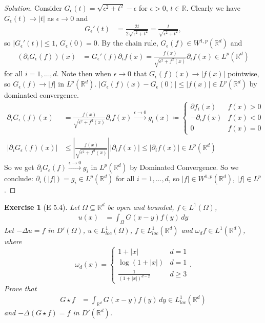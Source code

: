 \documentclass{report}
\theoremstyle{tommy}
\newtheorem{ex}[defn]{Exercise}
\begin{document}
  \begin{proof}[Solution]
    Consider \(G_\epsilon(t)= \sqrt{\epsilon^2 + t^2} - \epsilon\) for \(\epsilon > 0\), \(t \in \mathbb{R}\). Clearly we have \(G_\epsilon(t) \to |t|\) as \(\epsilon \to 0\) and 
    \begin{align*}
      G_\epsilon'(t) &= \frac{2t}{2 \sqrt{\epsilon^2 + t^2}} = \frac{t}{\sqrt{\epsilon^2 + t^2}},
    \end{align*}
    so \(|G_\epsilon'(t)| \le 1\), \(G_\epsilon(0) = 0\). By the chain rule, \(G_\epsilon(f) \in W^{1,p}(\mathbb{R}^d)\) and 
    \begin{align*}
      (\partial_i G_\epsilon(f))(x) &= G_\epsilon'(f) \partial_if(x) = \frac{f(x)}{\sqrt{\epsilon^2 + f^2(x)}} \partial_i f(x) \in L^p(\mathbb{R}^d)
    \end{align*}
    for all \(i = 1, \dots, d\). Note then when \(\epsilon \to 0\) that \(G_\epsilon(f)(x) \to |f(x)|\) pointwise, so \(G_\epsilon(f) \to |f|\) in \(L^p(\mathbb{R}^d)\). \(|G_\epsilon(f)(x) - G_\epsilon(0)| \le |f(x)| \in L^p(\mathbb{R}^d)\) by dominated convergence. \begin{align*}
      \partial_i G_\epsilon(f)(x) 
      &= \frac{f(x)}{\sqrt{\epsilon^2 + f^2(x)}} \partial_i f(x) \xrightarrow{\epsilon \to 0} g_i(x) \coloneqq \begin{cases}
        \partial f_i(x) & f(x) > 0 \\ - \partial_i f(x) & f(x) < 0 \\ 0 & f(x) = 0
      \end{cases} \\
      |\partial_i G_\epsilon(f)(x)|
      &\le \left| \frac{f(x)}{\sqrt{\epsilon^2 + f^2(x)}}\right| |\partial_i f(x)| \le |\partial_i f(x)| \in L^p(\mathbb{R}^d)
    \end{align*}
    So we get \(\partial_i G_\epsilon(f) \xrightarrow{\epsilon \to 0} g_i\) in \(L^p(\mathbb{R}^d)\) by Dominated Convergence. So we conclude: \(\partial_i(|f|) = g_i \in L^p(\mathbb{R}^d)\) for all \(i = 1, \dots, d\), so \(|f| \in W^{1,p}(\mathbb{R}^d)\), \(|f| \in L^p\).
  \end{proof}

  \begin{ex}[E 5.4]
    Let \(\Omega \subseteq \mathbb{R}^d\) be open and bounded, \(f \in L^1(\Omega)\), 
    \begin{align*}
      u(x) &= \int_\Omega G(x-y)f(y) \, dy
    \end{align*}
    Let \(- \Delta u = f\) in \(D'(\Omega)\), \(u \in L_{loc}^1(\Omega)\), \(f \in L_{loc}^1(\mathbb{R}^d)\) and \(\omega_d f \in L^1(\mathbb{R}^d)\), where \[\omega_d (x) = \begin{cases}
      1 + |x| & d = 1 \\ \log(1 + |x|) & d = 1 \\ \frac{1}{(1 + |x|)^{d-2}} & d \ge 3
    \end{cases}.\]
    Prove that \begin{align*}
      G \star f &= \int_{\mathbb{R}^d} G(x-y) f(y) \, dy \in L_{loc}^1(\mathbb{R}^d) 
    \end{align*}
    and \(- \Delta (G \star f) = f\) in \(D'(\mathbb{R}^d)\).
  \end{ex}
\end{document}
